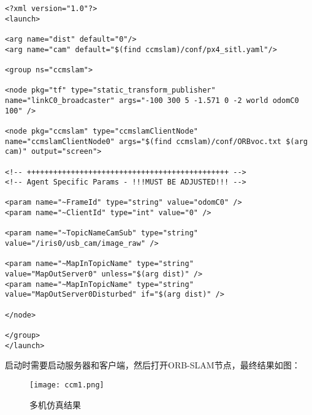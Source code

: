 \begin{verbatim}
<?xml version="1.0"?>
<launch>

<arg name="dist" default="0"/>
<arg name="cam" default="$(find ccmslam)/conf/px4_sitl.yaml"/>

<group ns="ccmslam">

<node pkg="tf" type="static_transform_publisher" 
name="linkC0_broadcaster" args="-100 300 5 -1.571 0 -2 world odomC0 100" /> 

<node pkg="ccmslam" type="ccmslamClientNode" 
name="ccmslamClientNode0" args="$(find ccmslam)/conf/ORBvoc.txt $(arg cam)" output="screen">

<!-- ++++++++++++++++++++++++++++++++++++++++++++++ -->
<!-- Agent Specific Params - !!!MUST BE ADJUSTED!!! -->

<param name="~FrameId" type="string" value="odomC0" />
<param name="~ClientId" type="int" value="0" />

<param name="~TopicNameCamSub" type="string" value="/iris0/usb_cam/image_raw" />

<param name="~MapInTopicName" type="string" 
value="MapOutServer0" unless="$(arg dist)" />
<param name="~MapInTopicName" type="string" 
value="MapOutServer0Disturbed" if="$(arg dist)" /> 

</node>

</group>
</launch>
\end{verbatim}

启动时需要启动服务器和客户端，然后打开ORB-SLAM节点，最终结果如图：

\begin{figure}[!ht]
	\centering
	\texttt{[image: ccm1.png]}
	\caption{多机仿真结果}
	\label{fig4-9}
\end{figure}



































